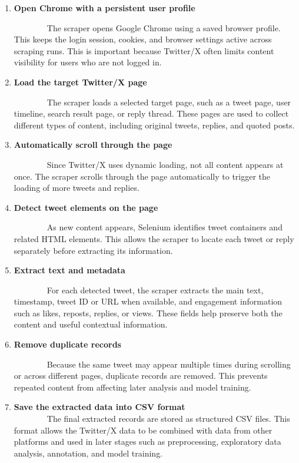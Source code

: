 \documentclass[12pt,oneside,openright,a4paper]{cpe-english-project}
\begin{document}
\begin{enumerate}
\item
  {\textbf{Open Chrome with a persistent user profile}\\
  \strut ~~~~~~~~The scraper opens Google Chrome using a saved browser profile. This keeps the login session, cookies, and browser settings active across scraping runs. This is important because Twitter/X often limits content visibility for users who are not logged in.}
\item
  {\textbf{Load the target Twitter/X page}\\
  \strut ~~~~~~~~The scraper loads a selected target page, such as a tweet page, user timeline, search result page, or reply thread. These pages are used to collect different types of content, including original tweets, replies, and quoted posts.}
\item
  {\textbf{Automatically scroll through the page}\\
  \strut ~~~~~~~~Since Twitter/X uses dynamic loading, not all content appears at once. The scraper scrolls through the page automatically to trigger the loading of more tweets and replies.}
\item
  {\textbf{Detect tweet elements on the page}\\
  \strut ~~~~~~~~As new content appears, Selenium identifies tweet containers and related HTML elements. This allows the scraper to locate each tweet or reply separately before extracting its information.}
\item
  {\textbf{Extract text and metadata}\\
  \strut ~~~~~~~~For each detected tweet, the scraper extracts the main text, timestamp, tweet ID or URL when available, and engagement information such as likes, reposts, replies, or views. These fields help preserve both the content and useful contextual information.}
\item
  {\textbf{Remove duplicate records}\\
  \strut ~~~~~~~~Because the same tweet may appear multiple times during scrolling or across different pages, duplicate records are removed. This prevents repeated content from affecting later analysis and model training.}
\item
  {\textbf{Save the extracted data into CSV format}\\
  ~~~~~~~~The final extracted records are stored as structured CSV files. This format allows the Twitter/X data to be combined with data from other platforms and used in later stages such as preprocessing, exploratory data analysis, annotation, and model training.}
\end{enumerate}
\end{document}
